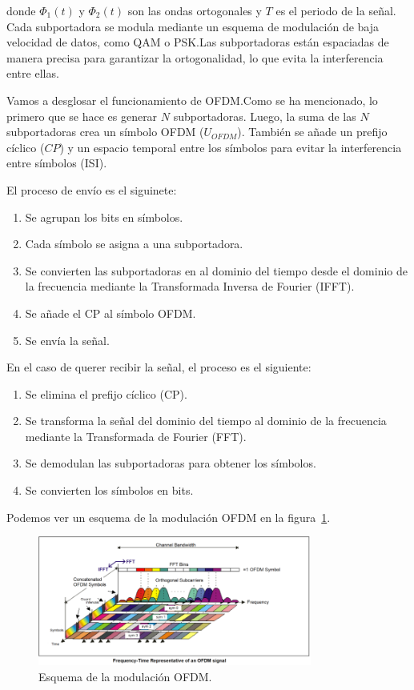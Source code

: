 \documentclass[12pt, letterpaper]{article}
\begin{document}
donde $\Phi_1(t)$ y $\Phi_2(t)$ son las ondas ortogonales y $T$ es el periodo de la señal. Cada subportadora se modula mediante un esquema de modulación de baja velocidad de datos, como QAM o PSK.\@ Las subportadoras están espaciadas de manera precisa para garantizar la ortogonalidad, lo que evita la interferencia entre ellas.

Vamos a desglosar el funcionamiento de OFDM.\@ Como se ha mencionado, lo primero que se hace es generar $N$ subportadoras. Luego, la suma de las $N$ subportadoras crea un símbolo OFDM ($U_{OFDM}$). También se añade un prefijo cíclico ($CP$) y un espacio temporal entre los símbolos para evitar la interferencia entre símbolos (ISI). 

El proceso de envío es el siguinete:
\begin{enumerate}
    \item Se agrupan los bits en símbolos.
    \item Cada símbolo se asigna a una subportadora.
    \item Se convierten las subportadoras en al dominio del tiempo desde el dominio de la frecuencia mediante la Transformada Inversa de Fourier (IFFT).
    \item Se añade el CP al símbolo OFDM.\@
    \item Se envía la señal.
\end{enumerate}

En el caso de querer recibir la señal, el proceso es el siguiente:
\begin{enumerate}
    \item Se elimina el prefijo cíclico (CP).
    \item Se transforma la señal del dominio del tiempo al dominio de la frecuencia mediante la Transformada de Fourier (FFT).
    \item Se demodulan las subportadoras para obtener los símbolos.
    \item Se convierten los símbolos en bits.
\end{enumerate}

\newpage
Podemos ver un esquema de la modulación OFDM en la figura~\ref{fig:ofdm}.
\begin{figure}[h]
    \centering
    \includegraphics[width=9cm]{images/OFDM.png}
    \caption{Esquema de la modulación OFDM.\label{fig:ofdm}}
\end{figure}
\end{document}
